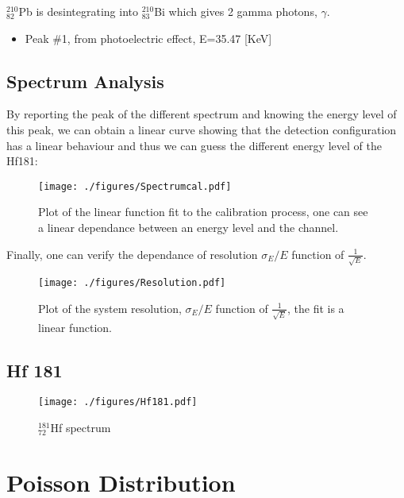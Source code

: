 \documentclass[a4paper,12pt,oneside]{article}
\begin{document}
$_{82}^{210}$Pb is desintegrating into $_{83}^{210}$Bi which gives 2 gamma photons, $\gamma$.

\begin{itemize}
\item Peak \#1, from photoelectric effect, E=35.47 [KeV]
\end{itemize}

\newpage
\subsection{Spectrum Analysis}
By reporting the peak of the different spectrum and knowing the energy level of this peak, we can obtain a linear curve showing that the detection configuration has a linear behaviour and thus we can guess the different energy level of the Hf181:


\begin{figure}[h!]
  \begin{center}
  \texttt{[image: ./figures/Spectrumcal.pdf]}
  \caption{Plot of the linear function fit to the calibration process, one can see a linear dependance between an energy level and the channel.} \label{fig:calibrate}
  \end{center}
\end{figure}

Finally, one can verify the dependance of resolution $\sigma_E/E$ function of $\frac{1}{\sqrt{E}}$.
\begin{figure}[h!]
  \begin{center}
  \texttt{[image: ./figures/Resolution.pdf]}
  \caption{Plot of the system resolution, $\sigma_E/E$ function of $\frac{1}{\sqrt{E}}$, the fit is a linear function.} \label{fig:resolution}
  \end{center}
\end{figure}

\newpage
\subsection{Hf 181}
\begin{figure}[h!]
  \begin{center}
  \texttt{[image: ./figures/Hf181.pdf]}
  \caption{$_{72}^{181}$Hf spectrum} \label{fig:Hf181}
  \end{center}
\end{figure}

\newpage
\section{Poisson Distribution}
\end{document}
